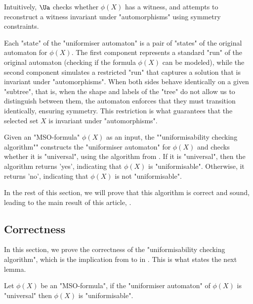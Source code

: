 \documentclass[a4paper,UKenglish,cleveref, autoref, thm-restate]{lipics-v2021}
\begin{document}
Intuitively, $\Ua$ checks whether $\phi(X)$ has a witness, and attempts to reconstruct a witness invariant under "automorphisms" using symmetry constraints.

Each "state" of the "uniformiser automaton" is a pair of "states" of the original automaton for $\phi(X)$.
The first component represents a standard "run" of the original automaton (checking if the formula $\phi(X)$
can be modeled), while the second component simulates a restricted "run" that captures a solution that is invariant under "automorphisms".
When both sides behave identically on a given "subtree", that is, when the shape and labels of the "tree" do not allow
us to distinguish between them, the automaton enforces that they must transition identically, ensuring symmetry. This restriction
is what guarantees that the selected set $X$ is invariant under "automorphisms".

\begin{definition}
	\AP Given an "MSO-formula" $\phi(X)$ as an input, the ""uniformisability checking algorithm"" constructs the "uniformiser automaton" for $\phi(X)$
	and checks whether it is "universal", using the algorithm from . If it is "universal", then the algorithm returns 'yes', indicating
	that $\phi(X)$ is "uniformisable". Otherwise, it returns 'no', indicating that $\phi(X)$ is not "uniformisable".
\end{definition}

In the rest of this section, we will prove that this algorithm is correct and sound, leading to the main result of this article, .

\subsection{Correctness}\label{section:correctness}

In this section, we prove the correctness of the "uniformisability checking algorithm", which is the
implication from  to   in .
This is what states the next lemma.

\begin{lemma}\label{lemma:universal-implies-uniformisable}
	Let $\phi(X)$ be an "MSO-formula", if the "uniformiser automaton" of $\phi(X)$ is "universal" then $\phi(X)$ is "uniformisable".
\end{lemma}
\end{document}
